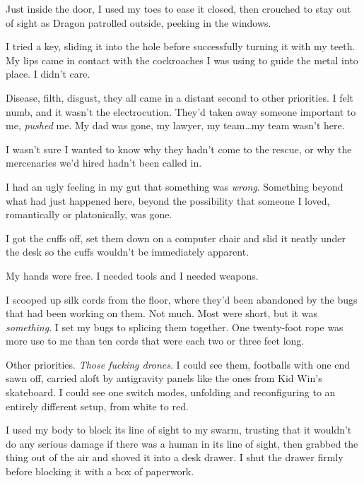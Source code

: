 Just inside the door, I used my toes to ease it closed, then crouched to stay out of sight as Dragon patrolled outside, peeking in the windows.



I tried a key, sliding it into the hole before successfully turning it with my teeth.  My lips came in contact with the cockroaches I was using to guide the metal into place.  I didn't care.



Disease, filth, disgust, they all came in a distant second to other priorities.  I felt numb, and it wasn't the electrocution.  They'd taken away someone important to me, \emph{pushed} me.  My dad was gone, my lawyer, my team\ldots my team wasn't here.



I wasn't sure I wanted to know why they hadn't come to the rescue, or why the mercenaries we'd hired hadn't been called in.



I had an ugly feeling in my gut that something was \emph{wrong}.  Something beyond what had just happened here, beyond the possibility that someone I loved, romantically or platonically, was gone.



I got the cuffs off, set them down on a computer chair and slid it neatly under the desk so the cuffs wouldn't be immediately apparent.



My hands were free.  I needed tools and I needed weapons.



I scooped up silk cords from the floor, where they'd been abandoned by the bugs that had been working on them.  Not much.  Most were short, but it was \emph{something}.  I set my bugs to splicing them together.  One twenty-foot rope was more use to me than ten cords that were each two or three feet long.



Other priorities.  \emph{Those fucking drones}.  I could see them, footballs with one end sawn off, carried aloft by antigravity panels like the ones from Kid Win's skateboard.  I could see one switch modes, unfolding and reconfiguring to an entirely different setup, from white to red.



I used my body to block its line of sight to my swarm, trusting that it wouldn't do any serious damage if there was a human in its line of sight, then grabbed the thing out of the air and shoved it into a desk drawer.  I shut the drawer firmly before blocking it with a box of paperwork.



